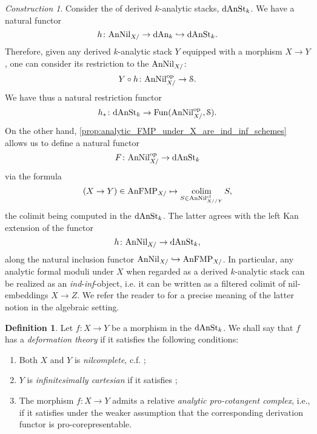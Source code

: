 \documentclass[10pt,a4paper,reqno]{amsart} %
\theoremstyle{plain}
\theoremstyle{definition}
\newtheorem{defin}[thm]{Definition}
\theoremstyle{remark}
\numberwithin{equation}{section}
\newtheorem{construction}[thm]{Construction}
\begin{document}
\begin{construction} \label{const:anFMP_as_ind_inf_schemes} Consider the \infcat of derived $k$-analytic stacks, $\mathrm{dAnSt}_k$.
    We have a natural functor
        \[
            h \colon \mathrm{AnNil}_{X/} \to \mathrm{dAn}_k \hookrightarrow \mathrm{dAnSt}_k.
        \]
    Therefore, given any derived $k$-analytic stack $Y$ equipped with a morphism $X \to Y$, one can consider its restriction to the \infcat
    $\mathrm{AnNil}_{X/}$:
        \[
            Y \circ h \colon \mathrm{AnNil}_{X/} ^\mathrm{op} \to \mathcal S.      
        \]
    We have thus a natural restriction functor
        \[
            h_* \colon \mathrm{dAnSt}_k \to \operatorname{Fun}(\mathrm{AnNil}_{X/} ^\mathrm{op}, \mathcal S).  
        \]
On the other hand, \cref{prop:analytic_FMP_under_X_are_ind_inf_schemes} allows us to define a natural functor
    \[
        F \colon \mathrm{AnNil}_{X/} ^\mathrm{op} \to \mathrm{dAnSt}_k
    \]
via the formula
    \[
        (X \to Y) \in \mathrm{AnFMP}_{X/ } \mapsto \operatorname*{colim}_{S \in \mathrm{AnNil}_{X/ /Y}^{\mathrm{cl}}} S,  
    \]
the colimit being computed in the \infcat $\mathrm{dAnSt}_k$. The latter agrees with the left Kan extension of the functor 
    \[
        h \colon \mathrm{AnNil}_{X/ } \to \mathrm{dAnSt}_k,  
    \]
along the natural inclusion functor $\mathrm{AnNil}_{X/ } \hookrightarrow \mathrm{AnFMP}_{X/ }$.
In particular, any analytic formal moduli under $X$ when regarded as a derived $k$-analytic stack can be realized
as an \emph{ind}-\emph{inf}-object, i.e. it can be written as a filtered colimit of nil-embeddings $X \to Z$.
We refer the reader to \cite[\S1]{Gaitsgory_Study_II} for a precise meaning
of the latter notion in the algebraic setting.
\end{construction}





\begin{defin}
    Let $f \colon X \to Y$ be a morphism in the \infcat $\mathrm{dAnSt}_k$. We shall say that $f$ has a \emph{deformation theory} if it satisfies the following conditions:
    \begin{enumerate}
        \item Both $X$ and $Y$ is \emph{nilcomplete}, c.f. \cite[Definition 7.4]{Porta_Yu_Representability};
        \item $Y$ is \emph{infinitesimally cartesian} if it satisfies \cite[Definition 7.3]{Porta_Yu_Representability};
        \item The morphism $f \colon X \to Y$ admits a relative \emph{analytic pro-cotangent complex}, i.e., if it satisfies \cite[Definition 7.6]{Porta_Yu_Representability} under the weaker assumption
        that the corresponding derivation functor is pro-corepresentable.
    \end{enumerate}
\end{defin}
\end{document}

